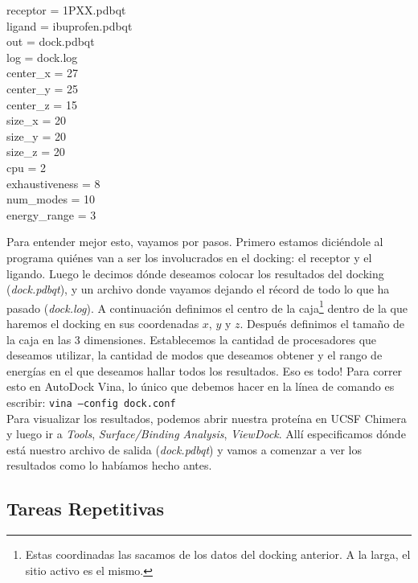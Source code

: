 \documentclass[10pt,letterpaper]{article}
\newcommand{\inlinecode}[1]{
\colorbox{light-gray}{\texttt{#1}}
}
\newenvironment{Code}
{
\begin{lrbox}{\selvestebox}%
\begin{minipage}{\dimexpr\columnwidth-2\fboxsep\relax}
\fontfamily{\ttdefault}\selectfont
}
{\end{minipage}\end{lrbox}%
\begin{center}
\colorbox{light-gray}{\usebox{\selvestebox}}
\end{center}
}
\begin{document}
\begin{Code}
receptor = 1PXX.pdbqt\\
ligand = ibuprofen.pdbqt\\
out = dock.pdbqt\\
log = dock.log\\
center\_x = 27\\
center\_y = 25\\
center\_z = 15\\
size\_x = 20\\
size\_y = 20\\
size\_z = 20\\
cpu = 2\\
exhaustiveness = 8\\
num\_modes = 10\\
energy\_range = 3
\end{Code}

Para entender mejor esto, vayamos por pasos. Primero estamos dici\'endole al programa qui\'enes van a ser los involucrados en el docking: el receptor y el ligando. Luego le decimos d\'onde deseamos colocar los resultados del docking (\emph{dock.pdbqt}), y un archivo donde vayamos dejando el r\'ecord de todo lo que ha pasado (\emph{dock.log}). A continuaci\'on definimos el centro de la caja\footnote{Estas coordinadas las sacamos de los datos del docking anterior. A la larga, el sitio activo es el mismo.} dentro de la que haremos el docking en sus coordenadas $x$, $y$ y $z$. Despu\'es definimos el tama\~no de la caja en las 3 dimensiones. Establecemos la cantidad de procesadores que deseamos utilizar, la cantidad de modos que deseamos obtener y el rango de energ\'ias en el que deseamos hallar todos los resultados. Eso es todo! Para correr esto en AutoDock Vina, lo \'unico que debemos hacer en la l\'inea de comando es escribir: \inlinecode{vina --config dock.conf}\\

Para visualizar los resultados, podemos abrir nuestra prote\'ina en UCSF Chimera y luego ir a \emph{Tools}, \emph{Surface/Binding Analysis}, \emph{ViewDock}. All\'i especificamos d\'onde est\'a nuestro archivo de salida (\emph{dock.pdbqt}) y vamos a comenzar a ver los resultados como lo hab\'iamos hecho antes.\\

\subsection{Tareas Repetitivas}
\end{document}

